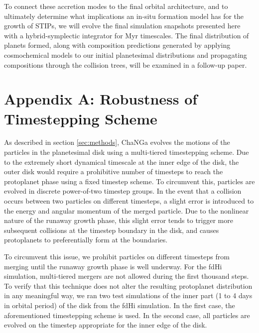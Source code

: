 To connect these accretion modes to the final orbital architecture,
and to ultimately determine what implications an in-situ formation model has for the growth of STIPs, we will evolve the final 
simulation snapshots presented here with a hybrid-symplectic integrator for Myr timescales. The final distribution of planets 
formed, along with composition predictions generated by applying cosmochemical models to our initial planetesimal distributions 
and propagating compositions through the collision trees, will be examined in a follow-up paper.

\section{Appendix A: Robustness of Timestepping Scheme}\label{sec:rung_ecc}

As described in section \ref{sec:methods}, {\sc ChaNGa}
  evolves the motions of the particles in the planetesimal disk using
  a multi-tiered timestepping scheme. Due to the extremely short
  dynamical timescale at the inner edge of the disk, the outer disk
  would require a prohibitive number of timesteps to reach the
  protoplanet phase using a fixed timestep scheme.  To circumvent this, particles are evolved in discrete power-of-two timestep groups. In the event that a collision occurs between two particles on different timesteps, a slight error is introduced to the energy and angular momentum of the merged particle. Due to the nonlinear nature of the runaway growth phase, this slight error tends to trigger more subsequent collisions at the timestep boundary in the disk, and causes protoplanets to preferentially form at the boundaries.

To circumvent this issue, we prohibit particles on different timesteps from merging until the runaway growth phase is well underway. For the fdHi simulation, multi-tiered mergers are not allowed during the first thousand steps. To verify that this technique does not alter the resulting protoplanet distribution in any meaningful way, we ran two test simulations of the inner part (1 to 4 days in orbital period) of the disk from the fdHi simulation. In the first case, the aforementioned timestepping scheme is used. In the second case, all particles are evolved on the timestep appropriate for the inner edge of the disk.

